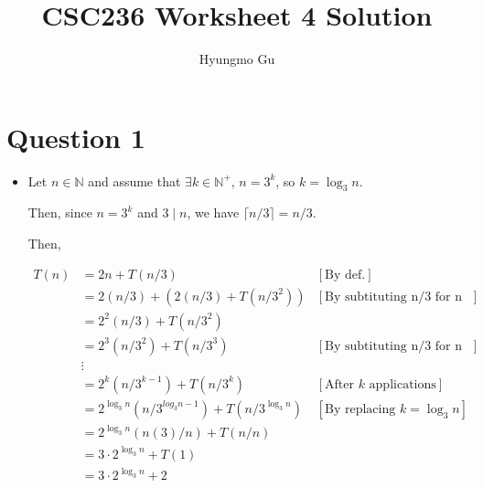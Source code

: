 \documentclass[12pt]{article}
\begin{document}
\title{CSC236 Worksheet 4 Solution}
\author{Hyungmo Gu}
\maketitle

\section*{Question 1}
\begin{itemize}
    \item

    Let $n \in \mathbb{N}$ and assume that $\exists k \in \mathbb{N}^+$, $n = 3^k$,
    so $k = \log_3 n$.

    \bigskip

    Then, since $n = 3^k$ and $3 \mid n$, we have $\lceil n/3 \rceil = n/3$.

    \bigskip

    Then,

    \begin{align}
        T(n) &= 2n + T(n/3) & [\text{By def.}]\\
        &= 2(n/3) + (2(n/3) +  T(n/3^2)) & [\text{By subtituting n/3 for n in def.}]\\
        &= 2^2(n/3) + T(n/3^2)\\
        &= 2^3(n/3^2) + T(n/3^3) & [\text{By subtituting n/3 for n in def.}]\\
        &\vdots\\
        &= 2^k(n/3^{k-1}) + T(n/3^k) & [\text{After $k$ applications}]\\
        &= 2^{\log_3 n}(n/3^{log_3 n - 1}) + T(n/3^{\log_3 n}) & [\text{By replacing $k = \log_3 n$}]\\
        &= 2^{\log_3 n}(n(3)/n) + T(n/n)\\
        &= 3 \cdot 2^{\log_3 n} + T(1)\\
        &= 3 \cdot 2^{\log_3 n} + 2
    \end{align}
\end{itemize}

\bigskip
\end{document}
